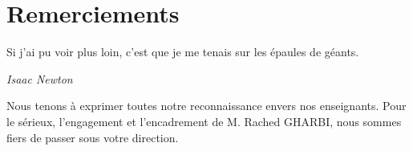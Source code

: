 \chapter*{Remerciements}

\vspace*{3cm}
\epigraph{Si j'ai pu voir plus loin, c'est que je me tenais sur les épaules de géants.}{\textit{Isaac Newton}}

Nous tenons à exprimer toutes notre reconnaissance envers nos enseignants. Pour le sérieux, l'engagement et l'encadrement de M. Rached GHARBI, nous sommes fiers de passer sous votre direction.